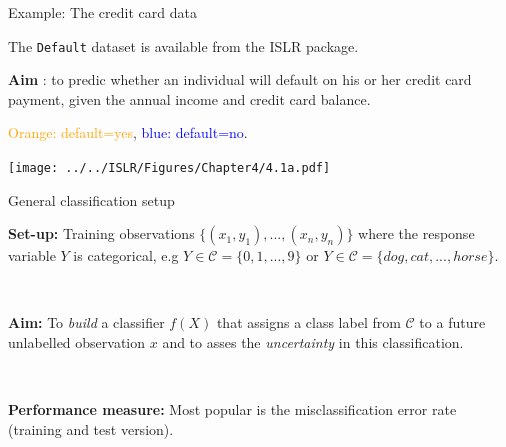 \documentclass[
  10pt,
  ignorenonframetext,
]{beamer}
\begin{document}
\begin{frame}[fragile]
\begin{block}{Example: The credit card data}
\protect\hypertarget{example-the-credit-card-data}{}
\vspace{2mm}

The \texttt{Default} dataset is available from the ISLR package.

\vspace{2mm}

\textbf{Aim} : to predic whether an individual will default on his or
her credit card payment, given the annual income and credit card
balance.

\textcolor{orange}{Orange: default=yes},
\textcolor{blue}{blue: default=no}.

\centering
\texttt{[image: ../../ISLR/Figures/Chapter4/4.1a.pdf]}
\end{block}
\end{frame}

\begin{frame}
\begin{block}{General classification setup}
\protect\hypertarget{general-classification-setup}{}
\(~\)

\textbf{Set-up:} Training observations
\(\{(x_1, y_1), ..., (x_n, y_n)\}\) where the response variable \(Y\) is
categorical, e.g \(Y \in \mathcal{C} = \{0, 1, ..., 9\}\) or
\(Y \in \mathcal{C} = \{dog, cat,... ,horse\}\).

\(~\)

\textbf{Aim: } To \emph{build} a classifier \(f(X)\) that assigns a
class label from \(\mathcal{C}\) to a future unlabelled observation
\(x\) and to asses the \emph{uncertainty} in this classification.

\(~\)

\textbf{Performance measure:} Most popular is the misclassification
error rate (training and test version).
\end{block}
\end{frame}
\end{document}
